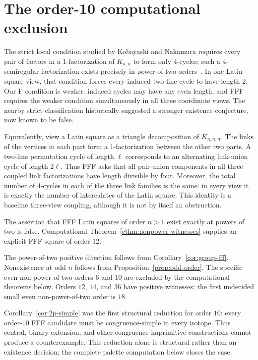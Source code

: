 \section{The order-10 computational exclusion}

The strict local condition studied by Kobayashi and Nakamura requires every
pair of factors in a $1$-factorization of $K_{n,n}$ to form only $4$-cycles;
such a $4$-semiregular factorization exists precisely in power-of-two
orders~\cite{KobayashiNakamura1994}.  In one Latin-square view, that condition
forces every induced two-line cycle to have length $2$.  Our F condition is
weaker: induced cycles may have any even length, and FFF requires the weaker
condition simultaneously in all three coordinate views.  The nearby strict
classification historically suggested a stronger existence conjecture, now
known to be false.

Equivalently, view a Latin square as a triangle decomposition of
$K_{n,n,n}$.  The links of the vertices in each part form a 1-factorization
between the other two parts.  A two-line permutation cycle of length $\ell$
corresponds to an alternating link-union cycle of length $2\ell$.  Thus FFF
asks that all pair-union components in all three coupled link factorizations
have length divisible by four.  Moreover, the total number of 4-cycles in
each of the three link families is the same: in every view it is exactly the
number of intercalates of the Latin square.  This identity is a baseline
three-view coupling, although it is not by itself an obstruction.

\begin{remark}
\label{rem:former-power-two}
The assertion that FFF Latin squares of order $n>1$ exist exactly at powers
of two is false.  Computational Theorem~\ref{cthm:nonpower-witnesses}
supplies an explicit FFF square of order $12$.
\end{remark}

The power-of-two positive direction follows from
Corollary~\ref{cor:group-fff}.  Nonexistence at odd $n$ follows from
Proposition~\ref{prop:odd-order}.  The specific even non-power-of-two
orders $6$ and $10$ are excluded by the computational theorems below.
Orders $12$, $14$, and $36$ have positive witnesses; the first undecided
small even non-power-of-two order is $18$.

Corollary~\ref{cor:2p-simple} was the first structural reduction for order
$10$: every order-$10$
FFF candidate must be congruence-simple in every isotope.  Thus central,
binary-extension, and other congruence-imprimitive constructions cannot
produce a counterexample.  This reduction alone is structural rather than an
existence decision; the complete palette computation below closes the case.

